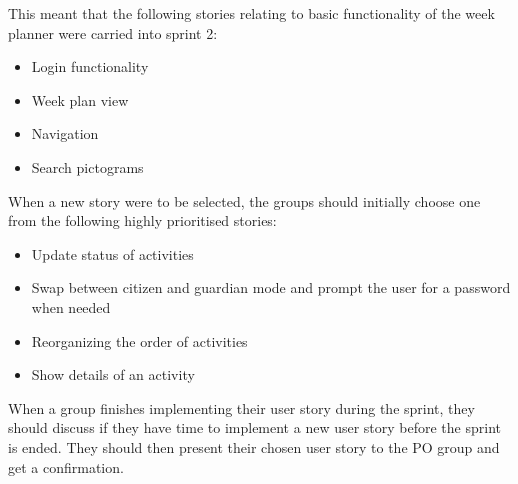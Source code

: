 This meant that the following stories relating to basic functionality of the week planner were carried into sprint 2:
\begin{itemize}
    \item Login functionality
    \item Week plan view
    \item Navigation
    \item Search pictograms
\end{itemize}
When a new story were to be selected, the groups should initially choose one from the following highly prioritised stories:
\begin{itemize}
    \item Update status of activities
    \item Swap between citizen and guardian mode and prompt the user for a password when needed
    \item Reorganizing the order of activities
    \item Show details of an activity
\end{itemize}
When a group finishes implementing their user story during the sprint, they should discuss if they have time to implement a new user story before the sprint is ended. They should then present their chosen user story to the PO group and get a confirmation.
